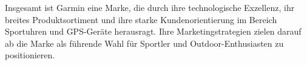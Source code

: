 Insgesamt ist Garmin eine Marke, die durch ihre technologische Exzellenz, ihr breites Produktsortiment und ihre starke Kundenorientierung im Bereich Sportuhren und GPS-Geräte herausragt. Ihre Marketingstrategien zielen darauf ab die Marke als führende Wahl für Sportler und Outdoor-Enthusiasten zu positionieren.
